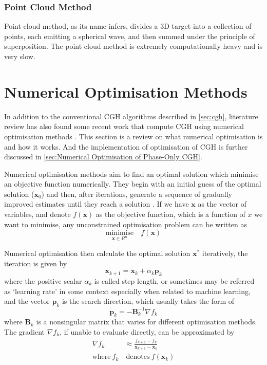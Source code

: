 \subsubsection{Point Cloud Method}
Point cloud method, as its name infers, divides a 3D target into a collection of points, each emitting a spherical wave, and then summed under the principle of superposition. The point cloud method is extremely computationally heavy and is very slow.



\newpage
\section{Numerical Optimisation Methods} \label{sec:Numerical Optimisation Methods}
In addition to the conventional CGH algorithms described in \cref{sec:cgh}, literature review has also found some recent work that compute CGH using numerical optimisation methods \cite{Zhang2017, Liu2020, Choi2021, Chen2021, Kadis2022}. This section is a review on what numerical optimisation is and how it works. And the implementation of optimisation of CGH is further discussed in \cref{sec:Numerical Optimisation of Phase-Only CGH}.

Numerical optimisation methods aim to find an optimal solution which minimise an objective function numerically. They begin with an initial guess of the optimal solution ($\textbf{x}_{0}$) and then, after iterations, generate a sequence of gradually improved estimates until they reach a solution \cite{Nocedal2006}. If we have $\textbf{x}$ as the vector of variables, and denote $f(\textbf{x})$ as the objective function, which is a function of $x$ we want to minimise, any unconstrained optimisation problem can be written as
\begin{equation}
  \underset{\textbf{x}\in R^n}{\text{minimise}}\quad f(\textbf{x})
  \label{eq:minimise_F}
\end{equation}

Numerical optimisation then calculate the optimal solution $\textbf{x}^*$ iteratively, the iteration is given by
\begin{equation}
  \textbf{x}_{k+1} = \textbf{x}_k+\alpha_k \textbf{p}_k
  \label{eq:optimisation_iteration}
\end{equation}
where the positive scalar $\alpha_k$ is called step length, or sometimes may be referred as `learning rate' in some context especially when related to machine learning, and the vector $\textbf{p}_k$ is the search direction, which usually takes the form of
\begin{equation}
  \textbf{p}_k = -\textbf{B}_k^{-1} \nabla f_{k} \label{eq:general-descent-direction}
\end{equation}
where $\textbf{B}_k$ is a nonsingular matrix that varies for different optimisation methods. The gradient $\nabla f_k$, if unable to evaluate directly, can be approximated by
\begin{align}
  \nabla f_k         & \approx \frac{f_{k+1}-f_{k}}{\textbf{x}_{k+1}-\textbf{x}_{k}} \nonumber \\
  \text{where}\  f_k & \ \text{denotes}\  f(\textbf{x}_k)
\end{align}

